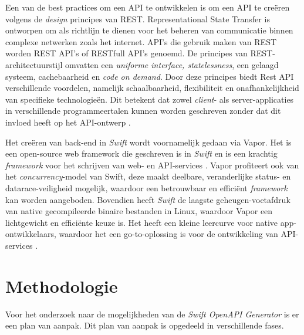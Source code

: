Een van de best practices om een API te ontwikkelen is om een API te creëren volgens de \textit{design} principes van REST. Representational State Transfer is ontworpen om als richtlijn te dienen voor het beheren van communicatie binnen complexe netwerken zoals het internet. API’s die gebruik maken van REST worden REST API’s of RESTfull API’s genoemd. De principes van REST-architectuurstijl omvatten een \textit{uniforme interface, statelessness}, een gelaagd systeem, cachebaarheid en \textit{code on demand}. Door deze principes biedt Rest API verschillende voordelen, namelijk schaalbaarheid, flexibiliteit en onafhankelijkheid van specifieke technologieën. Dit betekent dat zowel \textit{client}- als server-applicaties in verschillende programmeertalen kunnen worden geschreven zonder dat dit invloed heeft op het API-ontwerp \autocite{2020}. 

Het creëren van back-end in \textit{Swift} wordt voornamelijk gedaan via Vapor. Het is een open-source web framework die geschreven is in \textit{Swift} en is een krachtig \textit{framework} voor het schrijven van web- en API-services \autocite{Nelson}. Vapor profiteert ook van het \textit{concurrency}-model van Swift, deze maakt deelbare, veranderlijke status- en datarace-veiligheid mogelijk, waardoor een betrouwbaar en efficiënt \textit{framework} kan worden aangeboden. Bovendien heeft \textit{Swift} de laagste geheugen-voetafdruk van native gecompileerde binaire bestanden in Linux, waardoor Vapor een lichtgewicht en efficiënte keuze is. Het heeft een kleine leercurve voor native app-ontwikkelaars, waardoor het een go-to-oplossing is voor de ontwikkeling van API-services \autocite{Pant2023}.



\section{Methodologie}%
\label{sec:methodologie}

Voor het onderzoek naar de mogelijkheden van de \textit{Swift OpenAPI Generator} is er een plan van aanpak. Dit plan van aanpak is opgedeeld in verschillende fases. 

